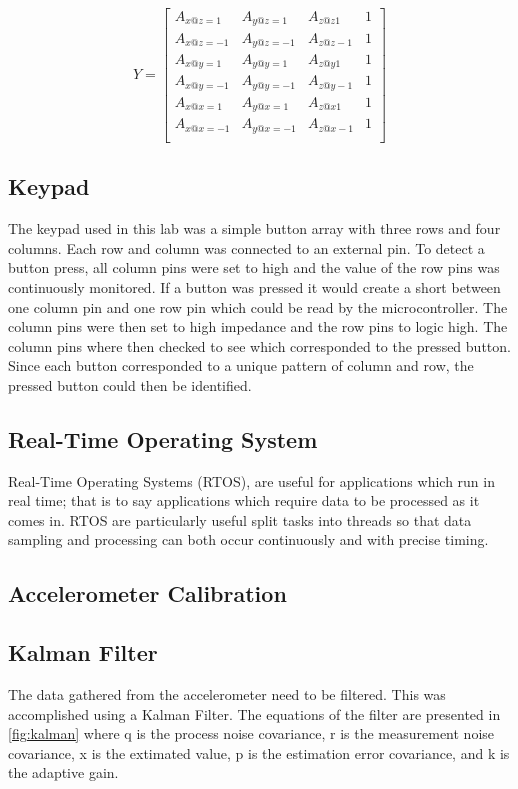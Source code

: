 \documentclass[12pt]{article}
\begin{document}
\begin{equation} \label{cal_eq:4}
 Y = \begin{bmatrix} A_{x@z=1} & A_{y@z=1} & A_{z@z1} & 1 \\
					  A_{x@z=-1} & A_{y@z=-1} & A_{z@z-1} & 1 \\
                      A_{x@y=1} & A_{y@y=1} & A_{z@y1} & 1 \\
                      A_{x@y=-1} & A_{y@y=-1} & A_{z@y-1} & 1 \\
                      A_{x@x=1} & A_{y@x=1} & A_{z@x1} & 1 \\
                      A_{x@x=-1} & A_{y@x=-1} & A_{z@x-1} & 1 \\
                      \end{bmatrix}
\end{equation}
\subsection{Keypad}
The keypad used in this lab was a simple button array with three rows and four columns. Each row and column was connected to an external pin. To detect a button press, all column pins were set to high and the value of the row pins was continuously monitored. If a button was pressed it would create a short between one column pin and one row pin which could be read by the microcontroller. The column pins were then set to high impedance and the row pins to logic high. The column pins where then checked to see which corresponded to the pressed button. Since each button corresponded to a unique pattern of column and row, the pressed button could then be identified.
\subsection{Real-Time Operating System}
Real-Time Operating Systems (RTOS), are useful for applications which run in real time; that is to say applications which require data to be processed as it comes in. RTOS are particularly useful split tasks into threads so that data sampling and processing can both occur continuously and with precise timing.
\subsection{Accelerometer Calibration}

\subsection{Kalman Filter}
The data gathered from the accelerometer need to be filtered. This was accomplished using a Kalman Filter. The equations of the filter are presented in \ref{fig:kalman} where q is the process noise covariance, r is the measurement noise covariance, x is the extimated value, p is the estimation error covariance, and k is the adaptive gain.
\end{document}
